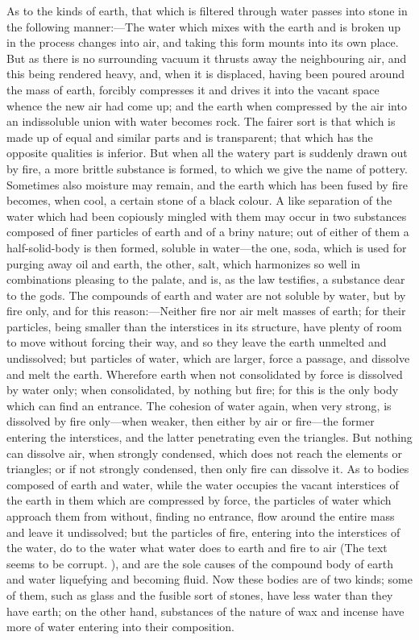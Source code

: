 \documentclass[11pt,letter]{article}
\begin{document}
\par  As to the kinds of earth, that which is filtered through water passes into stone in the following manner:—The water which mixes with the earth and is broken up in the process changes into air, and taking this form mounts into its own place. But as there is no surrounding vacuum it thrusts away the neighbouring air, and this being rendered heavy, and, when it is displaced, having been poured around the mass of earth, forcibly compresses it and drives it into the vacant space whence the new air had come up; and the earth when compressed by the air into an indissoluble union with water becomes rock. The fairer sort is that which is made up of equal and similar parts and is transparent; that which has the opposite qualities is inferior. But when all the watery part is suddenly drawn out by fire, a more brittle substance is formed, to which we give the name of pottery. Sometimes also moisture may remain, and the earth which has been fused by fire becomes, when cool, a certain stone of a black colour. A like separation of the water which had been copiously mingled with them may occur in two substances composed of finer particles of earth and of a briny nature; out of either of them a half-solid-body is then formed, soluble in water—the one, soda, which is used for purging away oil and earth, the other, salt, which harmonizes so well in combinations pleasing to the palate, and is, as the law testifies, a substance dear to the gods. The compounds of earth and water are not soluble by water, but by fire only, and for this reason:—Neither fire nor air melt masses of earth; for their particles, being smaller than the interstices in its structure, have plenty of room to move without forcing their way, and so they leave the earth unmelted and undissolved; but particles of water, which are larger, force a passage, and dissolve and melt the earth. Wherefore earth when not consolidated by force is dissolved by water only; when consolidated, by nothing but fire; for this is the only body which can find an entrance. The cohesion of water again, when very strong, is dissolved by fire only—when weaker, then either by air or fire—the former entering the interstices, and the latter penetrating even the triangles. But nothing can dissolve air, when strongly condensed, which does not reach the elements or triangles; or if not strongly condensed, then only fire can dissolve it. As to bodies composed of earth and water, while the water occupies the vacant interstices of the earth in them which are compressed by force, the particles of water which approach them from without, finding no entrance, flow around the entire mass and leave it undissolved; but the particles of fire, entering into the interstices of the water, do to the water what water does to earth and fire to air (The text seems to be corrupt. ), and are the sole causes of the compound body of earth and water liquefying and becoming fluid. Now these bodies are of two kinds; some of them, such as glass and the fusible sort of stones, have less water than they have earth; on the other hand, substances of the nature of wax and incense have more of water entering into their composition.
\end{document}
